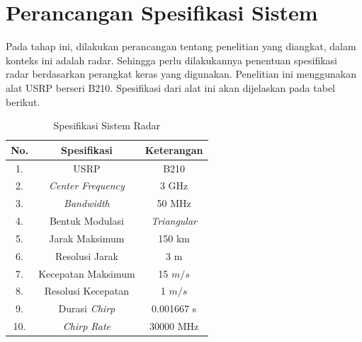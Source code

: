 \section{Perancangan Spesifikasi Sistem}
Pada tahap ini, dilakukan perancangan tentang penelitian yang diangkat, dalam konteks ini adalah radar. Sehingga perlu dilakukannya penentuan spesifikasi radar berdasarkan perangkat keras yang digunakan. Penelitian ini menggunakan alat USRP berseri B210.  Spesifikasi dari alat ini akan dijelaskan pada tabel berikut.

\begin{center}
	\begin{longtable}{| c | c | c |}
		\caption{Spesifikasi Sistem Radar}
		\label{tab:spekRadar}\\
		\hline
		No. & Spesifikasi 					& Keterangan\\\hline
		1.  & USRP 							& B210\\
		2.  & \textit{Center Frequency}  	& 3 GHz \\
		3.  & \textit{Bandwidth} 			& 50 MHz \\
		4.	& Bentuk Modulasi				& \textit{Triangular}\\
		5.  & Jarak Maksimum 				& 150 km \\
		6.  & Resolusi Jarak 				& 3 m \\
		7.  & Kecepatan Maksimum			& 15 $m/s$ \\
		8.  & Resolusi Kecepatan 			& 1 $m/s$\\
		9.	& Durasi \textit{Chirp}			& 0.001667 s\\
		10.	& \textit{Chirp Rate}			& 30000 MHz\\
		\hline
	\end{longtable}
\end{center}

